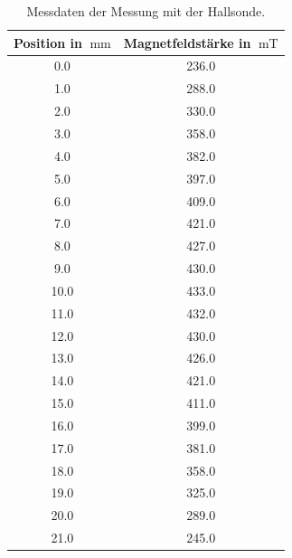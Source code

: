 \begin{table}[h!]
  \centering
  \caption{Messdaten der Messung mit der Hallsonde.}
  \label{tab:magFeld}
  \begin{tabular}{c | c}
    \toprule
    Position in $\SI{}{\milli\meter}$ & Magnetfeldstärke in $\SI{}{\milli\tesla}$ \\
    \midrule
    0.0 & 236.0 \\
    1.0 & 288.0 \\
    2.0 & 330.0 \\
    3.0 & 358.0 \\
    4.0 & 382.0 \\
    5.0 & 397.0 \\
    6.0 & 409.0 \\
    7.0 & 421.0 \\
    8.0 & 427.0 \\
    9.0 & 430.0 \\
    10.0 & 433.0 \\
    11.0 & 432.0 \\
    12.0 & 430.0 \\
    13.0 & 426.0 \\
    14.0 & 421.0 \\
    15.0 & 411.0 \\
    16.0 & 399.0 \\
    17.0 & 381.0 \\
    18.0 & 358.0 \\
    19.0 & 325.0 \\
    20.0 & 289.0 \\
    21.0 & 245.0 \\
    \bottomrule
  \end{tabular}
\end{table}
\FloatBarrier
\newpage
